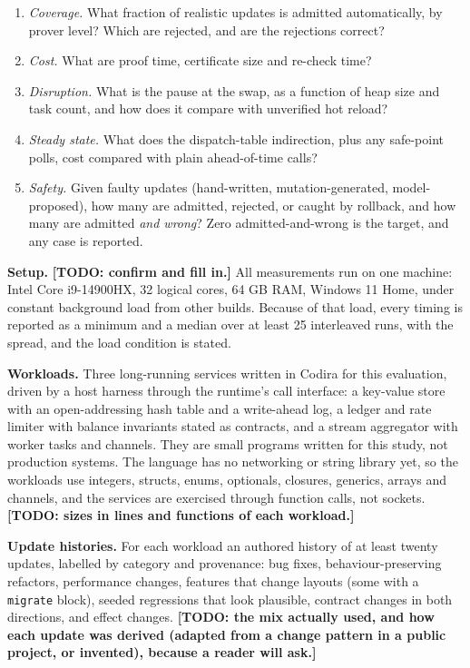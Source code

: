 \documentclass[10pt,twocolumn]{article}
\newcommand{\todo}[1]{{\color{red}\textbf{[TODO: #1]}}}
\begin{document}
\begin{enumerate}
\item \emph{Coverage.} What fraction of realistic updates is admitted automatically, by prover level? Which are rejected, and are the rejections correct?
\item \emph{Cost.} What are proof time, certificate size and re-check time?
\item \emph{Disruption.} What is the pause at the swap, as a function of heap size and task count, and how does it compare with unverified hot reload?
\item \emph{Steady state.} What does the dispatch-table indirection, plus any safe-point polls, cost compared with plain ahead-of-time calls?
\item \emph{Safety.} Given faulty updates (hand-written, mutation-generated, model-proposed), how many are admitted, rejected, or caught by rollback, and how many are admitted \emph{and wrong}? Zero admitted-and-wrong is the target, and any case is reported.
\end{enumerate}
\textbf{Setup.} \todo{confirm and fill in.} All measurements run on one machine: Intel Core i9-14900HX, 32 logical cores, 64 GB RAM, Windows 11 Home, under constant background load from other builds. Because of that load, every timing is reported as a minimum and a median over at least 25 interleaved runs, with the spread, and the load condition is stated.

\textbf{Workloads.} Three long-running services written in Codira for this evaluation, driven by a host harness through the runtime's call interface: a key-value store with an open-addressing hash table and a write-ahead log, a ledger and rate limiter with balance invariants stated as contracts, and a stream aggregator with worker tasks and channels. They are small programs written for this study, not production systems. The language has no networking or string library yet, so the workloads use integers, structs, enums, optionals, closures, generics, arrays and channels, and the services are exercised through function calls, not sockets. \todo{sizes in lines and functions of each workload.}

\textbf{Update histories.} For each workload an authored history of at least twenty updates, labelled by category and provenance: bug fixes, behaviour-preserving refactors, performance changes, features that change layouts (some with a \texttt{migrate} block), seeded regressions that look plausible, contract changes in both directions, and effect changes. \todo{the mix actually used, and how each update was derived (adapted from a change pattern in a public project, or invented), because a reader will ask.}
\end{document}
